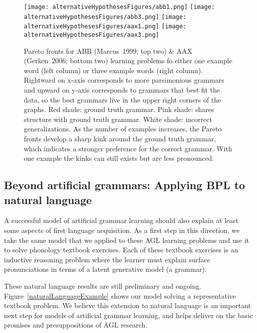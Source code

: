 \documentclass{article}
\begin{document}
\begin{figure}[H]

\texttt{[image: alternativeHypothesesFigures/abb1.png]} \texttt{[image: alternativeHypothesesFigures/abb3.png]}
\texttt{[image: alternativeHypothesesFigures/aax1.png]} \texttt{[image: alternativeHypothesesFigures/aax3.png]}
  
  \caption{Pareto fronts for ABB  (Marcus~1999; top two) \& AAX  (Gerken~2006; bottom two) learning problems fo either one example word (left column) or three example words  (right column). Rightward on x-axis corresponds to more parsimonious grammars and upward on y-axis corresponds to grammars that best fit the data, so the best grammars live in the upper right corners of the graphs. {\color{red}Red shade}: ground truth grammar. {\color{red!60}Pink shade}: shares structure with ground truth grammar. White shade: incorrect generalizations. As the number of examples increases, the Pareto fronts develop a sharp kink around the ground truth grammar, which indicates a stronger preference for the correct grammar. With one example the kinks can still exists but are less pronounced.}\label{quadrupleFrontier}
\end{figure}

\subsection{Beyond artificial grammars: Applying BPL to natural language}

A successful model of artificial grammar learning should also explain
at least some aspects of first language acquisition.  As a first step
in this direction, we take the same model that we applied to these AGL
learning problems and use it to solve phonology textbook exercises.
Each of these textbook exercises is an inductive reasoning problem
where the learner must explain surface pronunciations in terms of a
latent generative model (a grammar).

These natural language results are still preliminary and
ongoing. Figure~\ref{naturalLanguageExample} shows our model solving a
representative textbook problem.  We believe this extension to
natural language is an important next step for models of artificial
grammar learning, and helps deliver on the basic promises and
presuppositions of AGL research.
\end{document}
